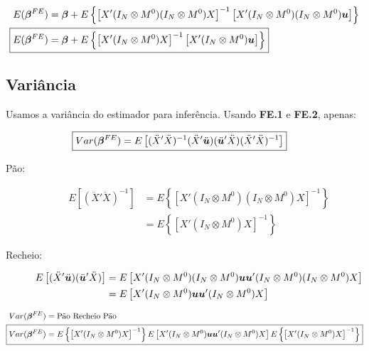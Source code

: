 \documentclass[11pt,oneside,a4paper]{article}
\numberwithin{equation}{section}
\begin{document}
\begin{description}
\vspace{-1 em}
\begin{align*}
E( \mbs{\beta}^{FE} ) &=
\mbs{\beta} +
E \left\{
\left[  
X' ( I_{N} \otimes M^{0} )( I_{N} \otimes M^{0} ) X 
\right]^{-1}
\left[ 
X' ( I_{N} \otimes M^{0} )( I_{N} \otimes M^{0} ) \mbs{u}
\right]
\right\}
\\
\Aboxed{
E( \mbs{\beta}^{FE} ) &=
\mbs{\beta} +
E \left\{
\left[  
X' ( I_{N} \otimes M^{0} ) X 
\right]^{-1}
\left[ 
X' ( I_{N} \otimes M^{0} ) \mbs{u}
\right]
\right\} }
\end{align*}

\subsection*{Variância}

Usamos a variância do estimador para inferência.
Usando \textbf{FE.1} e \textbf{FE.2}, apenas:

\vspace{-1 em}
\begin{align*} 
	\Aboxed{
Var( \mbs{\beta}^{FE} ) = 
E \left[
( \ddot{X}' \ddot{X} )^{-1}
(\ddot{X}' \ddot{\mbs{u}}) (\ddot{\mbs{u}}' \ddot{X} )
( \ddot{X}' \ddot{X} )^{-1} 
\right]}
\end{align*}


\begin{description}
\item [Pão:]
\begin{align*}
E\left[ ( \ddot{X}' \ddot{X} )^{-1} \right] &=
E \left\{ \left[
X' ( I_{N} \otimes M^{0} ) ( I_{N} \otimes M^{0} ) X
\right]^{-1} \right\}
\\ &=
E \left\{ \left[
X' ( I_{N} \otimes M^{0} ) X
\right]^{-1} \right\}
\end{align*}

\item [Recheio:]
\begin{align*}
E\left[
(\ddot{X}' \ddot{\boldsymbol{u}}) (\ddot{\boldsymbol{u}}' \ddot{X} ) 
\right] 
&=
E \left[
X' ( I_{N} \otimes M^{0} ) ( I_{N} \otimes M^{0} ) 
\boldsymbol{u} \boldsymbol{u}'
( I_{N} \otimes M^{0} ) ( I_{N} \otimes M^{0} ) X
\right]
\\ &=
E \left[
X' ( I_{N} \otimes M^{0} ) \boldsymbol{u} \boldsymbol{u}' ( I_{N} \otimes M^{0} ) X
\right]
\end{align*}
\end{description}

\vspace{-1 em}
\begin{align*} 
Var( \mbs{\beta}^{FE} ) &= \text{Pão Recheio Pão}
\\ 
\Aboxed{
Var( \mbs{\beta}^{FE} ) &= 
E \left\{ \left[
X' ( I_{N} \otimes M^{0} ) X
\right]^{-1} \right\}
E \left[
X' ( I_{N} \otimes M^{0} ) \mbs{u} \mbs{u}' ( I_{N} \otimes M^{0} ) X
\right]
E \left\{ \left[
X' ( I_{N} \otimes M^{0} ) X
\right]^{-1} \right\}
}
\end{align*}


\end{description}
\end{document}
